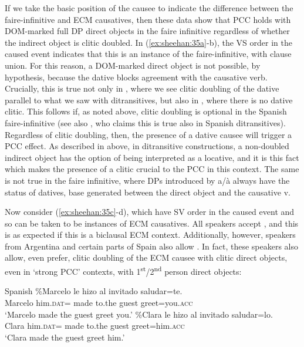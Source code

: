 \documentclass[output=paper,colorlinks,citecolor=brown,nonflat]{./langscibook}
\begin{document}
If we take the basic position of the causee to indicate the difference between the faire-infinitive and ECM causatives, then these data show that PCC holds with DOM-marked full DP direct objects in the faire infinitive regardless of whether the indirect object is clitic doubled. In (\ref{ex:sheehan:35a}-b), the VS order in the caused event indicates that this is an instance of the faire-infinitive, with clause union. For this reason, a DOM-marked direct object is not possible, by hypothesis, because the dative blocks agreement with the causative verb. Crucially, this is true not only in , where we see clitic doubling of the dative parallel to what we saw with ditransitives, but also in , where there is no dative clitic. This follows if, as noted above, clitic doubling is optional in the Spanish faire-infinitive (see also \citealt{Pineda2013}, who claims this is true also in Spanish ditransitives). Regardless of clitic doubling, then, the presence of a dative causee will trigger a PCC effect. As described in  above, in ditransitive constructions, a non-doubled indirect object has the option of being interpreted as a locative, and it is this fact which makes the presence of a clitic crucial to the PCC in this context. The same is not true in the faire infinitive, where DPs introduced by a/à always have the status of datives, base generated between the direct object and the causative v. 

Now consider (\ref{ex:sheehan:35c}-d), which have SV order in the caused event and so can be taken to be instances of ECM causatives. All speakers accept , and this is as expected if this is a biclausal ECM context. Additionally, however, speakers from Argentina and certain parts of Spain also allow . In fact, these speakers also allow, even prefer, clitic doubling of the ECM causee with clitic direct objects, even in ‘strong PCC’ contexts, with 1\textsuperscript{st}/2\textsuperscript{nd} person direct objects:

\ea%
    \label{ex:sheehan:36}
    Spanish
    \ea\label{ex:sheehan:36a}
    \gll    \%Marcelo   le   hizo   al   invitado saludar=te.\\
            Marcelo   him.\textsc{dat=}   made   to.the   guest  greet=you.\textsc{acc}\\
    \glt    ‘Marcelo made the guest greet you.’
    \ex\label{ex:sheehan:36b}
    \gll    \%Clara   le   hizo   al   invitado   saludar=lo.\\
            Clara   him.\textsc{dat=} made   to.the   guest   greet=him.\textsc{acc}\\
    \glt    ‘Clara made the guest greet him.’ 
    \z
\z
\end{document}

